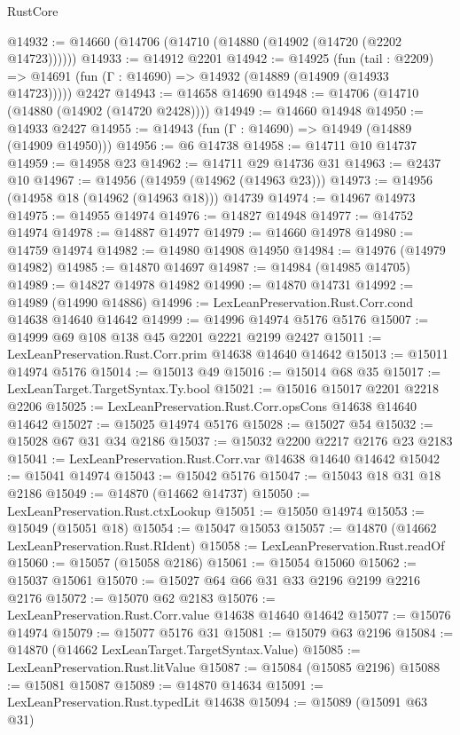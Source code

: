 \begin{lexlean}{RustCore}
\begin{coremodule}
@14932 := @14660 (@14706 (@14710 (@14880 (@14902 (@14720 (@2202 @14723))))))
@14933 := @14912 @2201
@14942 := @14925
    (fun (tail : @2209) => @14691 (fun (Γ : @14690) => @14932 (@14889 (@14909 (@14933 @14723)))))
    @2427
@14943 := @14658 @14690
@14948 := @14706 (@14710 (@14880 (@14902 (@14720 @2428))))
@14949 := @14660 @14948
@14950 := @14933 @2427
@14955 := @14943 (fun (Γ : @14690) => @14949 (@14889 (@14909 @14950)))
@14956 := @6 @14738
@14958 := @14711 @10 @14737
@14959 := @14958 @23
@14962 := @14711 @29 @14736 @31
@14963 := @2437 @10
@14967 := @14956 (@14959 (@14962 (@14963 @23)))
@14973 := @14956 (@14958 @18 (@14962 (@14963 @18))) @14739
@14974 := @14967 @14973
@14975 := @14955 @14974
@14976 := @14827 @14948
@14977 := @14752 @14974
@14978 := @14887 @14977
@14979 := @14660 @14978
@14980 := @14759 @14974
@14982 := @14980 @14908 @14950
@14984 := @14976 (@14979 @14982)
@14985 := @14870 @14697
@14987 := @14984 (@14985 @14705)
@14989 := @14827 @14978 @14982
@14990 := @14870 @14731
@14992 := @14989 (@14990 @14886)
@14996 := LexLeanPreservation.Rust.Corr.cond @14638 @14640 @14642
@14999 := @14996 @14974 @5176 @5176
@15007 := @14999 @69 @108 @138 @45 @2201 @2221 @2199 @2427
@15011 := LexLeanPreservation.Rust.Corr.prim @14638 @14640 @14642
@15013 := @15011 @14974 @5176
@15014 := @15013 @49
@15016 := @15014 @68 @35
@15017 := LexLeanTarget.TargetSyntax.Ty.bool
@15021 := @15016 @15017 @2201 @2218 @2206
@15025 := LexLeanPreservation.Rust.Corr.opsCons @14638 @14640 @14642
@15027 := @15025 @14974 @5176
@15028 := @15027 @54
@15032 := @15028 @67 @31 @34 @2186
@15037 := @15032 @2200 @2217 @2176 @23 @2183
@15041 := LexLeanPreservation.Rust.Corr.var @14638 @14640 @14642
@15042 := @15041 @14974
@15043 := @15042 @5176
@15047 := @15043 @18 @31 @18 @2186
@15049 := @14870 (@14662 @14737)
@15050 := LexLeanPreservation.Rust.ctxLookup
@15051 := @15050 @14974
@15053 := @15049 (@15051 @18)
@15054 := @15047 @15053
@15057 := @14870 (@14662 LexLeanPreservation.Rust.RIdent)
@15058 := LexLeanPreservation.Rust.readOf
@15060 := @15057 (@15058 @2186)
@15061 := @15054 @15060
@15062 := @15037 @15061
@15070 := @15027 @64 @66 @31 @33 @2196 @2199 @2216 @2176
@15072 := @15070 @62 @2183
@15076 := LexLeanPreservation.Rust.Corr.value @14638 @14640 @14642
@15077 := @15076 @14974
@15079 := @15077 @5176 @31
@15081 := @15079 @63 @2196
@15084 := @14870 (@14662 LexLeanTarget.TargetSyntax.Value)
@15085 := LexLeanPreservation.Rust.litValue
@15087 := @15084 (@15085 @2196)
@15088 := @15081 @15087
@15089 := @14870 @14634
@15091 := LexLeanPreservation.Rust.typedLit @14638
@15094 := @15089 (@15091 @63 @31)

\end{coremodule}
\end{lexlean}
